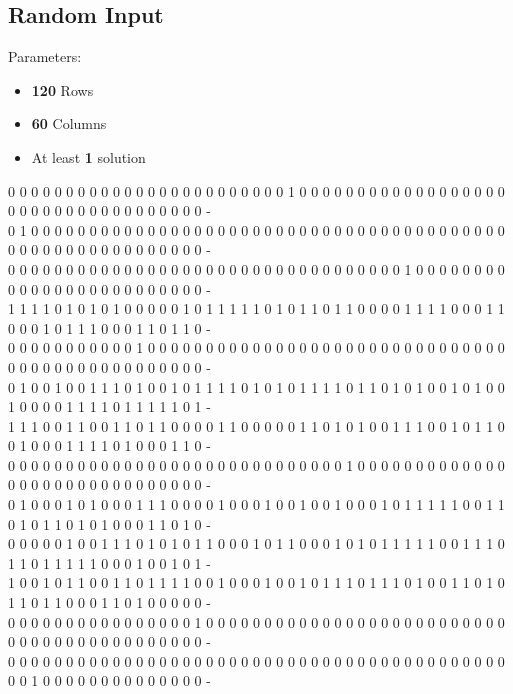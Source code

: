 \subsection{Random Input}
Parameters:
\begin{itemize}
    \item \textbf{120} Rows
    \item \textbf{60} Columns
    \item At least \textbf{1} solution
\end{itemize}
\begin{center}
\scriptsize{
0 0 0 0 0 0 0 0 0 0 0 0 0 0 0 0 0 0 0 0 0 0 0 0 1 0 0 0 0 0 0 0 0 0 0 0 0 0 0 0 0 0 0 0 0 0 0 0 0 0 0 0 0 0 0 0 0 0 0 0 -\\ 
0 1 0 0 0 0 0 0 0 0 0 0 0 0 0 0 0 0 0 0 0 0 0 0 0 0 0 0 0 0 0 0 0 0 0 0 0 0 0 0 0 0 0 0 0 0 0 0 0 0 0 0 0 0 0 0 0 0 0 0 -\\ 
0 0 0 0 0 0 0 0 0 0 0 0 0 0 0 0 0 0 0 0 0 0 0 0 0 0 0 0 0 0 0 0 0 0 1 0 0 0 0 0 0 0 0 0 0 0 0 0 0 0 0 0 0 0 0 0 0 0 0 0 -\\ 
1 1 1 1 0 1 0 1 0 1 0 0 0 0 0 1 0 1 1 1 1 1 0 1 0 1 1 0 1 1 0 0 0 0 1 1 1 1 0 0 0 1 1 0 0 0 1 0 1 1 1 0 0 0 1 1 0 1 1 0 -\\ 
0 0 0 0 0 0 0 0 0 0 0 1 0 0 0 0 0 0 0 0 0 0 0 0 0 0 0 0 0 0 0 0 0 0 0 0 0 0 0 0 0 0 0 0 0 0 0 0 0 0 0 0 0 0 0 0 0 0 0 0 -\\ 
0 1 0 0 1 0 0 1 1 1 0 1 0 0 1 0 1 1 1 1 0 1 0 1 0 1 1 1 1 0 1 1 0 1 0 1 0 0 1 0 1 0 0 1 0 0 0 0 1 1 1 1 0 1 1 1 1 1 0 1 -\\ 
1 1 1 0 0 1 1 0 0 1 1 0 1 1 0 0 0 0 1 1 0 0 0 0 0 1 1 0 1 0 1 0 0 1 1 1 0 0 1 0 1 1 0 0 1 0 0 0 1 1 1 1 0 1 0 0 0 1 1 0 -\\ 
0 0 0 0 0 0 0 0 0 0 0 0 0 0 0 0 0 0 0 0 0 0 0 0 0 0 0 0 0 1 0 0 0 0 0 0 0 0 0 0 0 0 0 0 0 0 0 0 0 0 0 0 0 0 0 0 0 0 0 0 -\\ 
0 1 0 0 0 1 0 1 0 0 0 1 1 1 0 0 0 0 1 0 0 0 1 0 0 1 0 0 1 0 0 0 1 0 1 1 1 1 1 0 0 1 1 0 1 0 1 1 0 1 0 1 0 0 0 1 1 0 1 0 -\\ 
0 0 0 0 0 1 0 0 1 1 1 0 1 0 1 0 1 1 0 0 0 1 0 1 1 0 0 0 1 0 1 0 1 1 1 1 1 0 0 1 1 1 0 1 1 0 1 1 1 1 1 0 0 0 1 0 0 1 0 1 -\\ 
1 0 0 1 0 1 1 0 0 1 1 0 1 1 1 1 0 0 1 0 0 0 1 0 0 1 0 1 1 1 0 1 1 1 0 1 0 0 1 1 0 1 0 1 1 0 1 1 0 0 0 1 1 0 1 0 0 0 0 0 -\\ 
0 0 0 0 0 0 0 0 0 0 0 0 0 0 0 0 1 0 0 0 0 0 0 0 0 0 0 0 0 0 0 0 0 0 0 0 0 0 0 0 0 0 0 0 0 0 0 0 0 0 0 0 0 0 0 0 0 0 0 0 -\\ 
0 0 0 0 0 0 0 0 0 0 0 0 0 0 0 0 0 0 0 0 0 0 0 0 0 0 0 0 0 0 0 0 0 0 0 0 0 0 0 0 0 0 0 0 0 1 0 0 0 0 0 0 0 0 0 0 0 0 0 0 -\\ 
}
\end{center}
